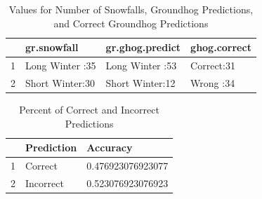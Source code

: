 \documentclass[12pt]{article}\usepackage[]{graphicx}\usepackage[]{color}
\begin{document}
\newpage
\begin{table}[ht]
\centering
\begin{tabular}{rlll}
  \hline
 &       gr.snowfall &     gr.ghog.predict &  ghog.correct \\ 
  \hline
1 & Long Winter :35   & Long Winter :53   & Correct:31   \\ 
  2 & Short Winter:30   & Short Winter:12   & Wrong  :34   \\ 
   \hline
\end{tabular}
\caption{Values for Number of Snowfalls, Groundhog Predictions, and Correct Groundhog Predictions} 
\end{table}
\begin{table}[ht]
\centering
\begin{tabular}{rll}
  \hline
 & Prediction & Accuracy \\ 
  \hline
1 & Correct & 0.476923076923077 \\ 
  2 & Incorrect & 0.523076923076923 \\ 
   \hline
\end{tabular}
\caption{Percent of Correct and Incorrect Predictions} 
\end{table}



 
 
 
\end{document}
